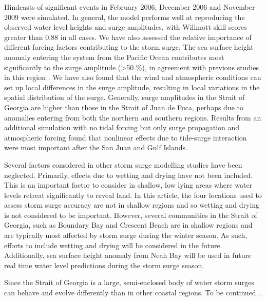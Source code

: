 \documentclass[pdftex,10pt]{article}
\begin{document}
Hindcasts of significant events in February 2006, December 2006 and November 2009 were simulated. In general, the model performs well at reproducing the observed water level heights and surge amplitudes, with Willmott skill scores greater than 0.88 in all cases. We have also assessed the relative importance of different forcing factors contributing to the storm surge. The sea surface height anomaly entering the system from the Pacific Ocean contributes most significantly to the surge amplitude (>50 \%), in agreement with previous studies in this region \citep{murty1995storm}. We have also found that the wind and atmospheric conditions can set up local differences in the surge amplitude, resulting in local variations in the spatial distribution of the surge. Generally, surge amplitudes in the Strait of Georgia are higher than those in the Strait of Juan de Fuca, perhaps due to anomalies entering from both the northern and southern regions. Results from an additional simulation with no tidal forcing but only surge propagation and atmospheric forcing found that nonlinear effects due to tide-surge interaction were most important after the San Juan and Gulf Islands. 

Several factors considered in other storm surge modelling studies have been neglected. Primarily, effects due to wetting and drying have not been included. This is an important factor to consider in shallow, low lying areas where water levels retreat significantly to reveal land. In this article, the four locations used to assess storm surge accuracy are not in shallow regions and so wetting and drying is not considered to be important. However, several communities in the Strait of Georgia, such as Boundary Bay and Crescent Beach are in shallow regions and are typically most affected by storm surge during the winter season. As such, efforts to include wetting and drying will be considered in the future. Additionally, sea surface height anomaly from Neah Bay will be used in future real time water level predictions during the storm surge season. 

Since the Strait of Georgia is a large, semi-enclosed body of water storm surges can behave and evolve differently than in other coastal regions. To be continued...



\appendix
\end{document}
